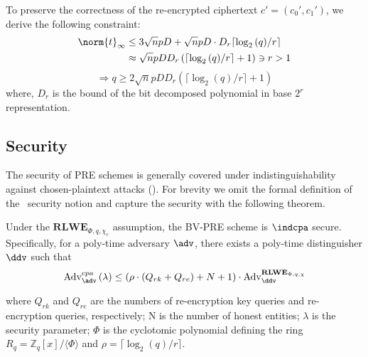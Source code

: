 To preserve the correctness of the re-encrypted ciphertext $c'=\left(c_0',c_1'\right)$, we derive the following constraint:
\begin{align*}
\norm{t}_\infty & \leq 3\sqrt{n}pD +  \sqrt{n}pD\cdot D_r {\lceil \log_2{(q)}/r \rceil} \\ & \approx \sqrt{n}p D D_r \left( {\lceil \log_2{(q)}/r \rceil}+1\right) \ni r > 1
\end{align*} 
$$ \Rightarrow q \geq 2\sqrt{n}p DD_r \left({\lceil \log_2{(q)}/r \rceil} +1\right) $$
where, $D_r$ is the bound of the bit decomposed polynomial in base $2^r$ representation.
\subsection{Security}
The security of PRE schemes is generally covered under indistinguishability against chosen-plaintext attacks (\indcpa). For brevity we omit the formal definition of the \indcpa\ security notion and capture the security with the following theorem. 
\begin{theorem} \cite{polyakov2017fast} Under the $\mathbf{RLWE}_{\Phi,q,\chi_e}$ assumption, the BV-PRE scheme is $\indcpa$ secure. Specifically, for a poly-time adversary $\adv$, there exists a poly-time distinguisher $\ddv$ such that 
$$\text{Adv}^{cpa}_{\adv}\left(\lambda \right) \leq \left( \rho\cdot\left(Q_{rk}+Q_{re}\right)+ N + 1\right)\cdot\text{Adv}^{\mathbf{RLWE}_{\Phi,q,\chi}}_{\ddv}$$ 

\noindent where $Q_{rk}$ and $Q_{re}$ are the numbers of re-encryption key queries and re-encryption queries, respectively; N is the number of honest entities; $\lambda$ is the security parameter; $\Phi$ is the cyclotomic polynomial defining the ring $R_q = \mathbb{Z}_q[x]/\langle \Phi\rangle$ and $\rho = \lceil \log_2{ (q) }/r\rceil$. 
\end{theorem}